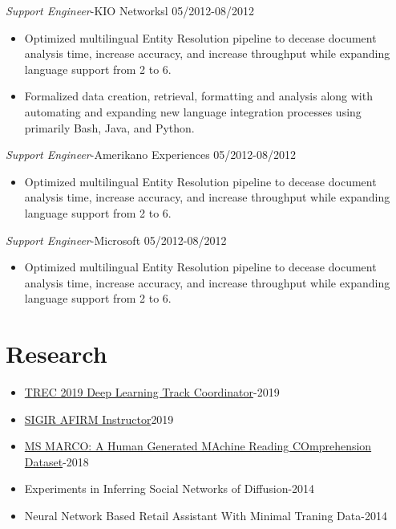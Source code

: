\documentclass[line,margin]{res}
\begin{document}
\begin{resume}
\begin{itemize}
\end{itemize}
{\sl Support Engineer}-KIO Networksl \hfill 05/2012-08/2012
\begin{itemize}  \itemsep -4pt
\item Optimized multilingual Entity Resolution pipeline to decease document analysis time, increase accuracy, and increase throughput while expanding language support from 2 to 6.
\item Formalized data creation, retrieval, formatting and analysis along with automating and expanding new language integration processes using primarily Bash, Java, and Python.
\end{itemize}
{\sl Support Engineer}-Amerikano Experiences \hfill 05/2012-08/2012
\begin{itemize}  \itemsep -4pt
\item Optimized multilingual Entity Resolution pipeline to decease document analysis time, increase accuracy, and increase throughput while expanding language support from 2 to 6.
\end{itemize}
{\sl Support Engineer}-Microsoft \hfill 05/2012-08/2012
\begin{itemize}  \itemsep -4pt
\item Optimized multilingual Entity Resolution pipeline to decease document analysis time, increase accuracy, and increase throughput while expanding language support from 2 to 6.
\end{itemize}
\section{Research}
\begin{itemize} 
\itemsep -5pt
\item  \href{https://trec.nist.gov/pubs/call2019.html}{TREC 2019 Deep Learning Track Coordinator}-2019
\item  \href{http://sigir.org/afirm2019/}{SIGIR AFIRM Instructor}2019
\item \href{https://arxiv.org/pdf/1611.09268.pdf}{MS MARCO: A Human Generated MAchine Reading COmprehension Dataset}-2018
\item Experiments in Inferring Social Networks of Diffusion-2014
\item Neural Network Based Retail Assistant With Minimal Traning Data-2014
\end{itemize}
\end{resume}
\end{document}
